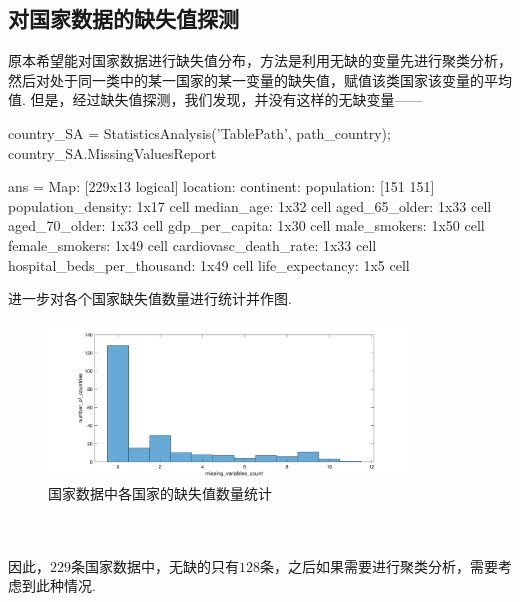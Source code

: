 \documentclass[a4paper, titlepage]{article}
\begin{document}
    \subsection{对国家数据的缺失值探测}
        原本希望能对国家数据进行缺失值分布，方法是利用无缺的变量先进行聚类分析，然后对处于同一类中的某一国家的某一变量的缺失值，赋值该类国家该变量的平均值. 但是，经过缺失值探测，我们发现，并没有这样的无缺变量——
\begin{matlabcode}
country_SA = StatisticsAnalysis('TablePath', path_country);
country_SA.MissingValuesReport
\end{matlabcode}
\begin{spacing}{0.8}
\begin{matlaboutput}
ans = 
                               Map: [229x13 logical]
                          location: {}
                         continent: {}
                        population: {[151 151]}
                population_density: {1x17 cell}
                        median_age: {1x32 cell}
                     aged_65_older: {1x33 cell}
                     aged_70_older: {1x33 cell}
                    gdp_per_capita: {1x30 cell}
                      male_smokers: {1x50 cell}
                    female_smokers: {1x49 cell}
             cardiovasc_death_rate: {1x33 cell}
        hospital_beds_per_thousand: {1x49 cell}
                   life_expectancy: {1x5 cell}
\end{matlaboutput}
\end{spacing}
    进一步对各个国家缺失值数量进行统计并作图.\\
    \begin{minipage}{\textwidth}
        \begin{figure}[H]
            \centering
            \includegraphics[width=0.85\textwidth]{./images/MissingValues_Country.png}
            \caption{国家数据中各国家的缺失值数量统计}
            \label{images:MissingValues_Country}
        \end{figure}
    \end{minipage}\\\quad\\
    因此，$229$条国家数据中，无缺的只有$128$条，之后如果需要进行聚类分析，需要考虑到此种情况. 
    
\end{document}
